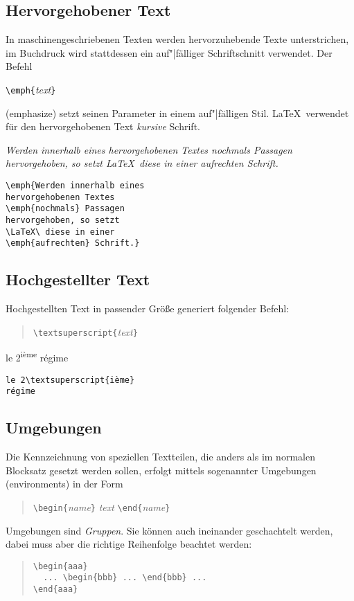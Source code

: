  
\subsection{Hervorgehobener Text}
 
In maschinengeschriebenen Texten werden hervorzuhebende Texte
unterstrichen, im Buchdruck wird stattdessen ein auf"|fälliger
Schriftschnitt verwendet.
Der Befehl 
\begin{beispiel}
\lstinline|\emph{|\textit{text}\lstinline|}| 
\end{beispiel}
(emphasize) setzt seinen Parameter in einem auf"|fälligen Stil.
\LaTeX\ verwendet für den hervorgehobenen Text \textit{kursive}
Schrift.

\exa 
\emph{Werden innerhalb eines hervorgehobenen Textes
\emph{nochmals} Passagen hervorgehoben, so setzt \LaTeX\ diese in
einer \emph{aufrechten} Schrift.}
\exb
\begin{verbatim}
\emph{Werden innerhalb eines 
hervorgehobenen Textes 
\emph{nochmals} Passagen
hervorgehoben, so setzt
\LaTeX\ diese in einer 
\emph{aufrechten} Schrift.}
\end{verbatim}
\exc


\subsection{Hochgestellter Text}
Hochgestellten Text in passender Größe generiert folgender Befehl:
\begin{quote}
\lstinline|\textsuperscript{|\textit{text}\lstinline|}|
\end{quote}
\exa
le 2\textsuperscript{ième} régime
\exb
\begin{verbatim}
le 2\textsuperscript{ième}
régime
\end{verbatim}
\exc




\subsection{Umgebungen} \label{env}

Die Kennzeichnung von speziellen Textteilen, die anders als im
normalen Blocksatz gesetzt werden sollen, erfolgt mittels
sogenannter Umgebungen (environments) in der Form
\begin{quote}
\lstinline|\begin{|\textit{name}\lstinline|}|\quad
   \textit{text}\quad
   \lstinline|\end{|\textit{name}\lstinline|}|
\end{quote}
Umgebungen sind \emph{Gruppen}.
Sie können auch ineinander geschachtelt werden, dabei muss aber
die richtige Reihenfolge beachtet werden:
\begin{quote}
\lstinline|\begin{aaa}|\\
\lstinline|  ... \begin{bbb} ... \end{bbb} ... |\\
\lstinline|\end{aaa}|
\end{quote}


